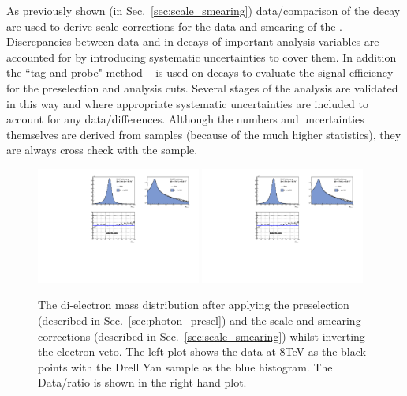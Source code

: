 As previously shown (in Sec.~\ref{sec:scale_smearing}) data/\MC comparison of the \Zee decay are used to derive scale corrections for the data and smearing of the \MC. Discrepancies between data and \MC in \Zee decays of important analysis variables are accounted for by introducing systematic uncertainties to cover them. In addition the ``tag and probe" method ~\cite{tag_and_probe} is used on \Zee decays to evaluate the signal efficiency for the preselection and analysis cuts. Several stages of the analysis are validated in this way and where appropriate systematic uncertainties are included to account for any data/\MC differences. Although the numbers and uncertainties themselves are derived from \Zee samples (because of the much higher statistics), they are always cross check with the \Zmumugamma sample.

\begin{figure}
  \includegraphics[width=0.48\textwidth]{ch3_comm_anal_comps/plots/zee_mass.pdf}
  \includegraphics[width=0.48\textwidth]{ch3_comm_anal_comps/plots/zee_mass_ratio.pdf}
  \caption{The di-electron mass distribution after applying the preselection (described in Sec.~\ref{sec:photon_presel}) and the scale and smearing corrections (described in Sec.~\ref{sec:scale_smearing}) whilst inverting the electron veto. The left plot shows the data at 8TeV as the black points with the Drell Yan \MC sample as the blue histogram. The Data/\MC ratio is shown in the right hand plot. }
  \label{fig:dielectronmass}
\end{figure}
